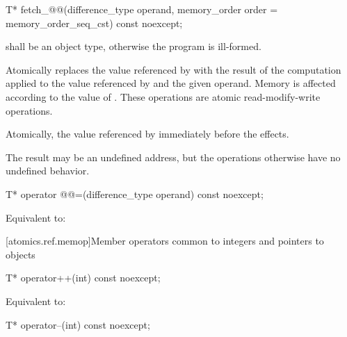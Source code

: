 %
%
\begin{itemdecl}
T* fetch_@@(difference_type operand, memory_order order = memory_order_seq_cst) const noexcept;
\end{itemdecl}

\begin{itemdescr}
\pnum
\requires {} shall be an object type,
otherwise the program is ill-formed.

\pnum
\effects Atomically replaces the value referenced by  with
the result of the computation applied to the value referenced by 
and the given operand.
Memory is affected according to the value of .
These operations are atomic read-modify-write operations.

\pnum
\returns Atomically, the value referenced by 
immediately before the effects.

\pnum
\remarks The result may be an undefined address,
but the operations otherwise have no undefined behavior.
\end{itemdescr}

%
%
\begin{itemdecl}
T* operator @@=(difference_type operand) const noexcept;
\end{itemdecl}

\begin{itemdescr}
\pnum
\effects Equivalent to:
\end{itemdescr}

[atomics.ref.memop]{Member operators
                          common to integers and pointers to objects}

%
%
\begin{itemdecl}
T* operator++(int) const noexcept;
\end{itemdecl}

\begin{itemdescr}
\pnum
\effects Equivalent to: 
\end{itemdescr}

%
%
\begin{itemdecl}
T* operator--(int) const noexcept;
\end{itemdecl}

